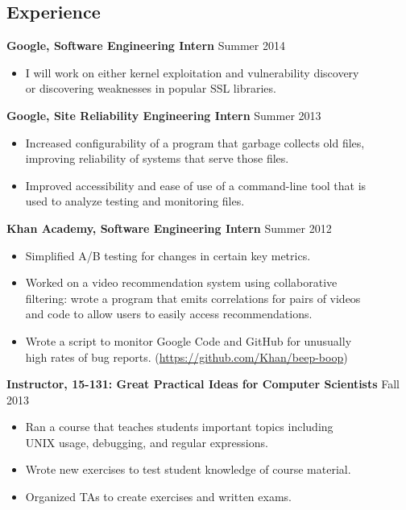 \documentclass[margin]{res}
\begin{document}
\begin{resume}
\section{Experience}
  \textbf{Google, Software Engineering Intern} \hfill Summer 2014
  \begin{itemize} \itemsep -2pt  %
    \item I will work on either kernel exploitation and vulnerability discovery \\
      or discovering weaknesses in popular SSL libraries.
  \end{itemize}
  \textbf{Google, Site Reliability Engineering Intern}
    \hfill Summer 2013
  \begin{itemize} \itemsep -2pt  %
    \item Increased configurability of a program that garbage collects old files,\\
          improving reliability of systems that serve those files.
    \item Improved accessibility and ease of use of a command-line tool that is\\
          used to analyze testing and monitoring files.
  \end{itemize}

  \textbf{Khan Academy, Software Engineering Intern} \hfill Summer 2012
  \begin{itemize} \itemsep -2pt %
  \item Simplified A/B testing for changes in certain key metrics.
  \item Worked on a video recommendation system using collaborative \\
    filtering: wrote a program that emits correlations for pairs of videos \\
    and code to allow users to easily access recommendations.
  \item Wrote a script to monitor Google Code and GitHub for unusually\\
    high rates of bug reports.
    (\href{https://github.com/Khan/beep-boop}{https://github.com/Khan/beep-boop})
  \end{itemize}

  \textbf{Instructor, 15-131: Great Practical Ideas for Computer Scientists}
    \hfill Fall 2013
  \begin{itemize} \itemsep -2pt
    \item Ran a course that teaches students important topics including\\
      UNIX usage, debugging, and regular expressions.
    \item Wrote new exercises to test student knowledge of course material.
    \item Organized TAs to create exercises and written exams.
  \end{itemize}


\end{resume}
\end{document}
